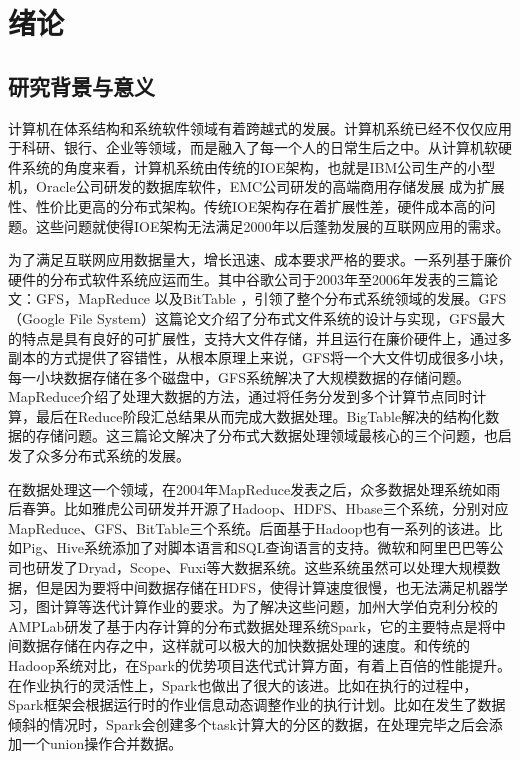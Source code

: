 \chapter{绪论}\label{chap:intro}

\section{研究背景与意义}
计算机在体系结构和系统软件领域有着跨越式的发展。计算机系统已经不仅仅应用于科研、银行、企业等领域，而是融入了每一个人的日常生后之中。从计算机软硬件系统的角度来看，计算机系统由传统的IOE架构，也就是IBM公司生产的小型机，Oracle公司研发的数据库软件，EMC公司研发的高端商用存储发展 成为扩展性、性价比更高的分布式架构。传统IOE架构存在着扩展性差，硬件成本高的问题。这些问题就使得IOE架构无法满足2000年以后蓬勃发展的互联网应用的需求\citet{bhosale2014review}。

为了满足互联网应用数据量大，增长迅速、成本要求严格的要求。一系列基于廉价硬件的分布式软件系统应运而生。其中谷歌公司于2003年至2006年发表的三篇论文：GFS\cite{ghemawat2003google}，MapReduce \cite{dean2008mapreduce} 以及BitTable \cite{chang2008bigtable}，引领了整个分布式系统领域的发展。GFS（Google File System）这篇论文介绍了分布式文件系统的设计与实现，GFS最大的特点是具有良好的可扩展性，支持大文件存储，并且运行在廉价硬件上，通过多副本的方式提供了容错性，从根本原理上来说，GFS将一个大文件切成很多小块，每一小块数据存储在多个磁盘中，GFS系统解决了大规模数据的存储问题。MapReduce介绍了处理大数据的方法，通过将任务分发到多个计算节点同时计算，最后在Reduce阶段汇总结果从而完成大数据处理。BigTable解决的结构化数据的存储问题。这三篇论文解决了分布式大数据处理领域最核心的三个问题，也启发了众多分布式系统的发展。

在数据处理这一个领域，在2004年MapReduce发表之后，众多数据处理系统如雨后春笋。比如雅虎公司研发并开源了Hadoop\cite{white2012hadoop}、HDFS\cite{shvachko2010hadoop}、Hbase\cite{vora2011hadoop}三个系统，分别对应MapReduce、GFS、BitTable三个系统。后面基于Hadoop也有一系列的该进。比如Pig、Hive\cite{thusoo2009hive}系统添加了对脚本语言和SQL\cite{armbrust2015spark}查询语言的支持。微软和阿里巴巴等公司也研发了Dryad\cite{isard2007dryad}，Scope\cite{chaiken2008scope}、Fuxi\cite{zhang2014fuxi}等大数据系统。这些系统虽然可以处理大规模数据，但是因为要将中间数据存储在HDFS\cite{shvachko2010hadoop}，使得计算速度很慢，也无法满足机器学习，图计算等迭代计算作业的要求。为了解决这些问题，加州大学伯克利分校的AMPLab研发了基于内存计算的分布式数据处理系统Spark\cite{zaharia2010spark}，它的主要特点是将中间数据存储在内存之中，这样就可以极大的加快数据处理的速度。和传统的Hadoop系统对比，在Spark的优势项目迭代式计算方面，有着上百倍的性能提升\cite{gopalani2015comparing}。在作业执行的灵活性上，Spark也做出了很大的该进。比如在执行的过程中，Spark框架会根据运行时的作业信息动态调整作业的执行计划。比如在发生了数据倾斜的情况时，Spark会创建多个task计算大的分区的数据，在处理完毕之后会添加一个union操作合并数据\cite{zaharia2010spark}。

